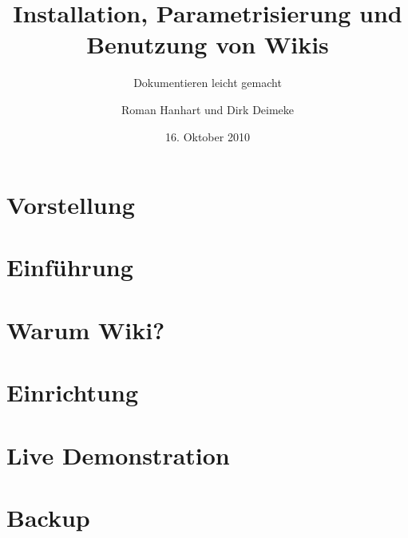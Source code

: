 \documentclass{beamer}
\title[Wikis]{Installation, Parametrisierung und Benutzung von Wikis}
\subtitle[Dokumentieren leicht gemacht]{Dokumentieren leicht gemacht}
\author[]{Roman Hanhart und Dirk Deimeke}
\institute{Ubucon 2010}
\date{16. Oktober 2010}
\begin{document}
\frame{\titlepage}

\section{Vorstellung} 



\section{Einführung}


\section{Warum Wiki?} 




\section{Einrichtung}



\section{Live Demonstration}


\section{Backup}


\end{document}
